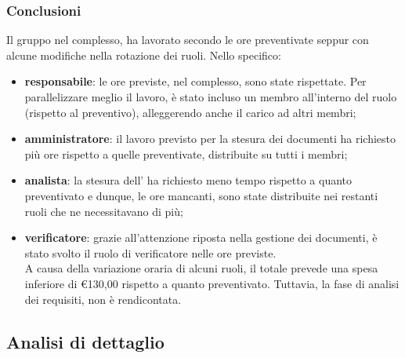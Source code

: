 \subsubsection{Conclusioni}
Il gruppo nel complesso, ha lavorato secondo le ore preventivate seppur con alcune modifiche nella rotazione dei ruoli.
Nello specifico:
\begin{itemize}
	\item {\bfseries responsabile}: le ore previste, nel complesso, sono state rispettate. Per parallelizzare meglio il lavoro, è stato incluso un membro all'interno del ruolo (rispetto al preventivo), alleggerendo anche il carico ad altri membri;
	\item {\bfseries amministratore}: il lavoro previsto per la stesura dei documenti ha richiesto più ore rispetto a quelle preventivate, distribuite su tutti i membri;
	\item {\bfseries analista}: la stesura dell' ha richiesto meno tempo rispetto a quanto preventivato e dunque, le ore mancanti, sono state distribuite nei restanti ruoli che ne necessitavano di più;
	\item {\bfseries verificatore}: grazie all'attenzione riposta nella gestione dei documenti, è stato svolto il ruolo di verificatore nelle ore previste.\\
		
	A causa della variazione oraria di alcuni ruoli, il totale prevede una spesa inferiore di \euro 130,00 rispetto a quanto preventivato.
	Tuttavia, la fase di analisi dei requisiti, non è rendicontata.
	
\end{itemize}



	

	
\newpage	
	
\subsection{ Analisi di dettaglio}


